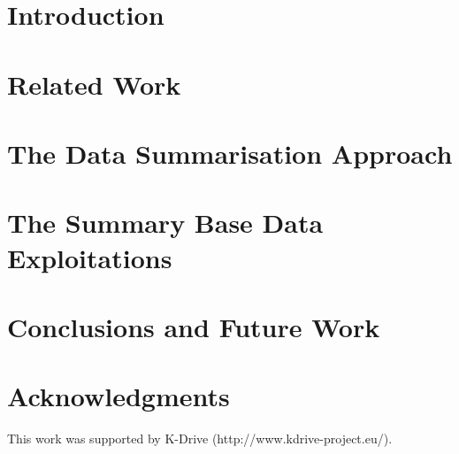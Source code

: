 \documentclass{llncs}
\begin{document}
\section{Introduction}\label{sec:Introduction}


\section{Related Work}\label{sec:RelatedWork}


\section{The Data Summarisation Approach}\label{sec:Motivation}


\section{The Summary Base Data Exploitations }

%


\section{Conclusions and Future Work}\label{sec:Conclusions}





\section*{Acknowledgments}

This work was supported by K-Drive (http://www.kdrive-project.eu/).



%






\clearpage
{} %
\renewcommand{\indexname}{Author Index}
\printindex \clearpage
{} %
\renewcommand{\indexname}{Subject Index}
%
\end{document}
